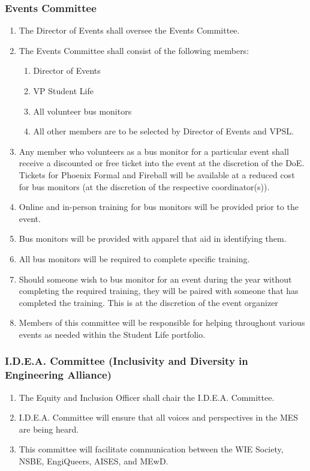 \subsubsection{Events Committee}
\label{events-committee}
\begin{enumerate}
 \item
  The Director of Events shall oversee the Events Committee.
 \item
  The Events Committee shall consist of the following members:

  \begin{enumerate}
   \item
    Director of Events
   \item
    VP Student Life
   \item
    All volunteer bus monitors
   \item    
    All other members are to be selected by Director of Events and VPSL. 
  \end{enumerate}
 \item
  Any member who volunteers as a bus monitor for a particular event shall receive a discounted or free ticket into the event at the discretion of the DoE.\hspace{0pt} \hspace{0pt}Tickets for Phoenix Formal and Fireball will be available at a reduced cost for bus monitors (at the discretion of the respective coordinator(s)).
 \item
  Online and in-person training for bus monitors will be provided prior to the event.
 \item
  Bus monitors will be provided with apparel that aid in identifying them.
 \item
  \hspace{0pt}All bus monitors will be required to complete specific
  training.
 \item
  Should someone wish to bus monitor for an event during the year without completing the required training, they will be paired with someone that has completed the training. This is at the discretion of the event organizer
 \item     
  Members of this committee will be responsible for helping throughout various events as needed within the Student Life portfolio. 
\end{enumerate}

\subsubsection{I.D.E.A. Committee (Inclusivity and Diversity in Engineering Alliance)}
\label{i.d.e.a.-committee-inclusivity-and-diversity-in-engineering-alliance}
\begin{enumerate}
 \item
  The Equity and Inclusion Officer shall chair the I.D.E.A. Committee.
 \item
  I.D.E.A. Committee will ensure that all voices and perspectives in the MES are being heard.
 \item
  This committee will facilitate communication between the WIE Society, NSBE, EngiQueers, AISES, and MEwD.
\end{enumerate}

